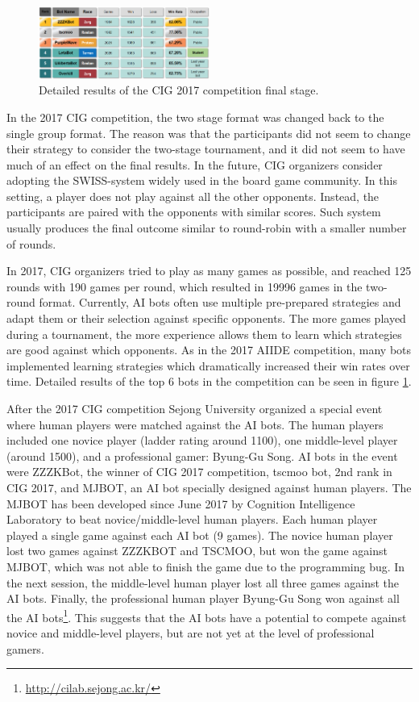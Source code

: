 \begin{figure}[t]
  \centering
  \includegraphics[width=0.5\textwidth]{fig/cig-results.png}
  \caption{Detailed results of the CIG 2017 competition final stage.}
  \label{figCIGresults}
\end{figure}

In the 2017 CIG competition, the two stage format was changed back to the single group format. The reason was that the participants did not seem to change their strategy to consider the two-stage tournament, and it did not seem to have much of an effect on the final results. In the future, CIG organizers consider adopting the SWISS-system widely used in the board game community. In this setting, a player does not play against all the other opponents. Instead, the participants are paired with the opponents with similar scores. Such system usually produces the final outcome similar to round-robin with a smaller number of rounds. 

In 2017, CIG organizers tried to play as many games as possible, and reached 125 rounds with 190 games per round, which resulted in 19996 games in the two-round format. Currently, AI bots often use multiple pre-prepared strategies and adapt them or their selection against specific opponents. The more games played during a tournament, the more experience allows them to learn which strategies are good against which opponents. As in the 2017 AIIDE competition, many bots implemented learning strategies which dramatically increased their win rates over time. Detailed results of the top 6 bots in the competition can be seen in figure \ref{figCIGresults}.

After the 2017 CIG competition Sejong University organized a special event where human players were matched against the AI bots. The human players included one novice player (ladder rating around 1100), one middle-level player (around 1500), and a professional gamer: Byung-Gu Song. AI bots in the event were ZZZKBot, the winner of CIG 2017 competition, tscmoo bot, 2nd rank in CIG 2017, and MJBOT, an AI bot specially designed against human players. The MJBOT has been developed since June 2017 by Cognition Intelligence Laboratory to beat novice/middle-level human players. Each human player played a single game against each AI bot (9 games). The novice human player lost two games against ZZZKBOT and TSCMOO, but won the game against MJBOT, which was not able to finish the game due to the programming bug. In the next session, the middle-level human player lost all three games against the AI bots. Finally, the professional human player Byung-Gu Song won against all the AI bots\footnote{\url{http://cilab.sejong.ac.kr/}}. This suggests that the AI bots have a potential to compete against novice and middle-level players, but are not yet at the level of professional gamers. 

